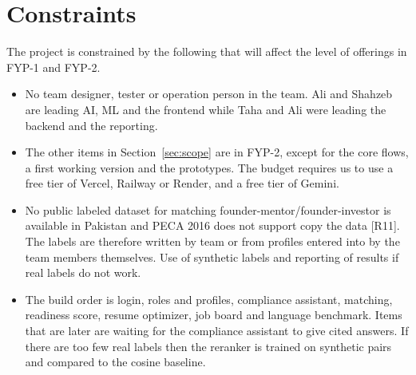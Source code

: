 \documentclass{FastFyp}
\newcommand{\src}[1]{[#1]}
\begin{document}
\section{Constraints}\label{sec:teamexp}\label{sec:fallback}
The project is constrained by the following that will affect the level of offerings in FYP-1 and FYP-2.
\begin{itemize}
\item No team designer, tester or operation person in the team. Ali and Shahzeb are leading AI, ML and the frontend while Taha and Ali were leading the backend and the reporting.
\item The other items in Section~\ref{sec:scope} are in FYP-2, except for the core flows, a first working version and the prototypes. The budget requires us to use a free tier of Vercel, Railway or Render, and a free tier of Gemini.
\item No public labeled dataset for matching founder-mentor/founder-investor is available in Pakistan and PECA 2016 does not support copy the data \src{R11}. The labels are therefore written by team or from profiles entered into by the team members themselves. Use of synthetic labels and reporting of results if real labels do not work.
\item The build order is login, roles and profiles, compliance assistant, matching, readiness score, resume optimizer, job board and language benchmark. Items that are later are waiting for the compliance assistant to give cited answers. If there are too few real labels then the reranker is trained on synthetic pairs and compared to the cosine baseline.
\end{itemize}
\end{document}
